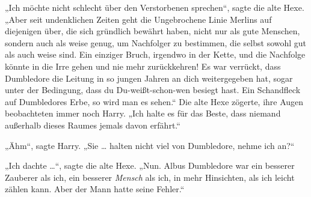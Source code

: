 „Ich möchte nicht schlecht über den Verstorbenen sprechen“, sagte die alte Hexe.
„Aber seit undenklichen Zeiten geht die Ungebrochene Linie Merlins auf diejenigen über, die sich gründlich bewährt haben, nicht nur als gute Menschen, sondern auch als weise genug, um Nachfolger zu bestimmen, die selbst sowohl gut als auch weise sind. Ein einziger Bruch, irgendwo in der Kette, und die Nachfolge könnte in die Irre gehen und nie mehr zurückkehren! Es war verrückt, dass Dumbledore die Leitung in so jungen Jahren an dich weitergegeben hat, sogar unter der Bedingung, dass du Du-weißt-schon-wen besiegt hast. Ein Schandfleck auf Dumbledores Erbe, so wird man es sehen.“
Die alte Hexe zögerte, ihre Augen beobachteten immer noch Harry.
„Ich halte es für das Beste, dass niemand außerhalb dieses Raumes jemals davon erfährt.“

„Ähm“, sagte Harry.
„Sie … halten nicht viel von Dumbledore, nehme ich an?“

„Ich dachte …“, sagte die alte Hexe.
„Nun. Albus Dumbledore war ein besserer Zauberer als ich, ein besserer \emph{Mensch} als ich, in mehr Hinsichten, als ich leicht zählen kann. Aber der Mann hatte seine Fehler.“

